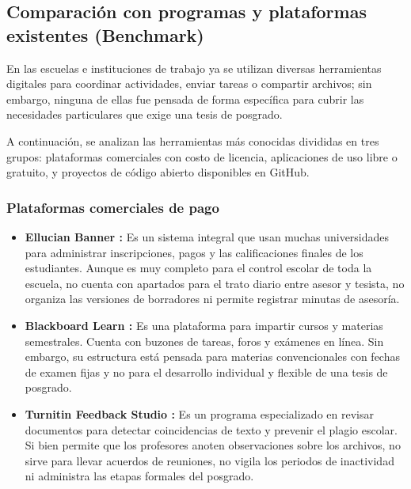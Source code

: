\subsection{Comparación con programas y plataformas existentes (Benchmark)}
\label{subsec:benchmark}

En las escuelas e instituciones de trabajo ya se utilizan diversas herramientas digitales para coordinar actividades, enviar tareas o compartir archivos; sin embargo, ninguna de ellas fue pensada de forma específica para cubrir las necesidades particulares que exige una tesis de posgrado.

A continuación, se analizan las herramientas más conocidas divididas en tres grupos: plataformas comerciales con costo de licencia, aplicaciones de uso libre o gratuito, y proyectos de código abierto disponibles en GitHub.

\subsubsection{Plataformas comerciales de pago}
\begin{itemize}
    \item \textbf{Ellucian Banner \parencite{ellucian2024banner}:} Es un sistema integral que usan muchas universidades para administrar inscripciones, pagos y las calificaciones finales de los estudiantes. Aunque es muy completo para el control escolar de toda la escuela, no cuenta con apartados para el trato diario entre asesor y tesista, no organiza las versiones de borradores ni permite registrar minutas de asesoría.
    \item \textbf{Blackboard Learn \parencite{anthology2024blackboard}:} Es una plataforma para impartir cursos y materias semestrales. Cuenta con buzones de tareas, foros y exámenes en línea. Sin embargo, su estructura está pensada para materias convencionales con fechas de examen fijas y no para el desarrollo individual y flexible de una tesis de posgrado.
    \item \textbf{Turnitin Feedback Studio \parencite{turnitin2024feedback}:} Es un programa especializado en revisar documentos para detectar coincidencias de texto y prevenir el plagio escolar. Si bien permite que los profesores anoten observaciones sobre los archivos, no sirve para llevar acuerdos de reuniones, no vigila los periodos de inactividad ni administra las etapas formales del posgrado.
\end{itemize}

